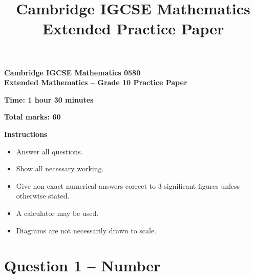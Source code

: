 \makeatletter
{}
\makeatother



\title{Cambridge IGCSE Mathematics\\
	Extended Practice Paper}
\author{}
\date{}


	
	\maketitle
	
	\begin{center}
		\textbf{Cambridge IGCSE Mathematics 0580}\\
		\textbf{Extended Mathematics -- Grade 10 Practice Paper}
	\end{center}
	
	\vspace{5mm}
	
	\noindent
	\textbf{Time: 1 hour 30 minutes}
	
	\vspace{3mm}
	
	\noindent
	\textbf{Total marks: 60}
	
	\vspace{5mm}
	
	\noindent
	\textbf{Instructions}
	\begin{itemize}
		\item Answer all questions.
		\item Show all necessary working.
		\item Give non-exact numerical answers correct to 3 significant figures unless otherwise stated.
		\item A calculator may be used.
		\item Diagrams are not necessarily drawn to scale.
	\end{itemize}
	
	\vspace{5mm}
	
	\section*{Question 1 -- Number }
	
